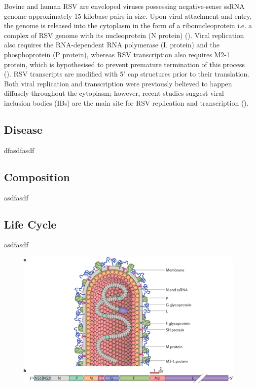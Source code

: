 Bovine and human RSV are enveloped viruses possessing negative-sense ssRNA genome approximately 15 kilobase-pairs in size. Upon viral attachment and entry, the genome is released into the cytoplasm in the form of a ribonucleoprotein i.e. a complex of RSV genome with its nucleoprotein (N protein) (\cite{Noton2015InitiationReplication}). Viral replication also requires the RNA-dependent RNA polymerase (L protein) and the phosphoprotein (P protein), whereas RSV transcription also requires M2-1 protein, which is hypothesised to prevent premature termination of this process (\cite{Tanner2014CrystalPhosphorylation}). RSV transcripts are modified with 5’ cap structures prior to their translation. Both viral replication and transcription were previously believed to happen diffusely throughout the cytoplasm; however, recent studies suggest viral inclusion bodies (IBs) are the main site for RSV replication and transcription (\cite{Rincheval2017FunctionalVirus}). 




\subsection{Disease} \label{subsec:Disease}
dfasdfasdf




\subsection{Composition} \label{subsec:Composition}
asdfasdf




\subsection{Life Cycle} \label{subsec:Life Cycle}
asdfasdf

\begin{figure}
    \centering
    \includegraphics[width=0.5\linewidth]{04. Introduction//Figs/RSV-composition.png}

    
\end{figure}


